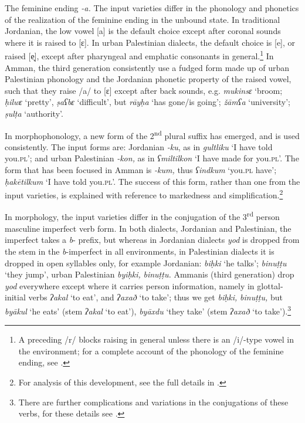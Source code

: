 \documentclass[output=paper]{langsci/langscibook}
\begin{document}
The feminine ending \textit{{}-a.} The input varieties differ in the phonology and phonetics of the realization of the feminine ending in the unbound state. In traditional Jordanian, the low vowel [a] is the default choice except after coronal sounds where it is raised to [ɛ]. In urban Palestinian dialects, the default choice is [e], or raised [e̝], except after pharyngeal and emphatic consonants in general.\footnote{A preceding /r/ blocks raising in general unless there is an /i/-type vowel in the environment; for a complete account of the phonology of the feminine ending, see \citet{Al-WerEtAl2015}.} In Amman, the third generation consistently use a fudged form made up of urban Palestinian phonology and the Jordanian phonetic property of the raised vowel, such that they raise /a/ to [ɛ] except after back sounds, e.g. \textit{mukinsɛ} ‘broom; \textit{ḥilwɛ} ‘pretty’, \textit{ṣaʕbɛ} ‘difficult’, but \textit{rāyḥa} ‘has gone/is going’; \textit{žāmʕa} ‘university’; \textit{ṣulṭa} ‘authority’.

In morphophonology, a new form of the 2\textsuperscript{nd} plural suffix has emerged, and is used consistently. The input forms are: Jordanian \textit{{}-ku}, as in \textit{gultliku} ‘I have told you.\textsc{pl}’; and urban Palestinian \textit{{}-kon,} as in \textit{ʕmiltilkon} ‘I have made for you.\textsc{pl}’. The form that has been focused in Amman is \textit{{}-kum,} thus \textit{ʕindkum} ‘you.\textsc{pl} have’; \textit{ḥakētilkum} ‘I have told you.\textsc{pl’.} The success of this form, rather than one from the input varieties, is explained with reference to markedness and simplification.\footnote{For analysis of this development, see the full details in \citet{Al-Wer2003}.}

In morphology, the input varieties differ in the conjugation of the 3\textsuperscript{rd} person masculine imperfect verb form. In both dialects, Jordanian and Palestinian, the imperfect takes a \textit{b}{}- prefix, but whereas in Jordanian dialects \textit{yod} is dropped from the stem in the \textit{b}{}-imperfect in all environments, in Palestinian dialects it is dropped in open syllables only, for example Jordanian: \textit{biḥki} ‘he talks’; \textit{binuṭṭu} ‘they jump’, urban Palestinian \textit{byiḥki,} \textit{binuṭṭu.} Ammanis (third generation) drop \textit{yod} everywhere except where it carries person information, namely in glottal-initial verbs \textit{ʔakal} ‘to eat’, and \textit{ʔaxað} ‘to take’; thus we get \textit{biḥki,} \textit{binuṭṭu,} but \textit{byākul} ‘he eats’ (stem \textit{ʔakal} ‘to eat’), \textit{byāxdu} ‘they take’ (stem \textit{ʔaxað} ‘to take’).\footnote{There are further complications and variations in the conjugations of these verbs, for these details see \citet{Al-Wer2014}.}
\end{document}
